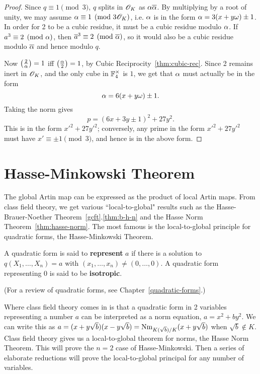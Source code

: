 \begin{proof}
Since $q\equiv 1\pmod 3$, $q$ splits in $\mathscr{O}_K$ as $\alpha\overline{\alpha}$. By multiplying by a root of unity, we may assume $\alpha\equiv 1\pmod{3\mathscr{O}_K}$, i.e. $\alpha$ is in the form $\alpha=3(x+y\omega)\pm1$. In order for 2 to be a cubic residue, it must be a cubic residue modulo $\alpha$. If $a^3\equiv 2\pmod{\alpha}$, then $\overline{a}^3\equiv 2\pmod{\overline{\alpha}}$, so it would also be a cubic residue modulo $\overline{\alpha}$ and hence modulo $q$.

Now $\left( {\frac{2}{\alpha}} \right)=1$ iff $\left( {\frac{\alpha}{2}} \right)=1$, by Cubic Reciprocity~\ref{thm:cubic-rec}. Since 2 remains inert in $\mathscr{O}_K$, and the only cube in $\mathbb{F}_4^{\times}$ is $1$, we get that $\alpha$ must actually be in the form
\[
\alpha=6(x+y\omega)\pm1.
\] 
Taking the norm gives
\[
p=(6x+3y\pm1)^2+27y^2.
\]
This is in the form $x'^2+27y'^2$; conversely, any prime in the form $x'^2+27y'^2$ must have $x'\equiv\pm1 \pmod3$, and hence is in the above form.
\end{proof}

\section{Hasse-Minkowski Theorem}
The global Artin map can be expressed as the product of local Artin maps. From class field theory, we get various ``local-to-global" results such as the Hasse-Brauer-Noether Theorem~\ref{gcft}.\ref{thm:b-h-n} and the Hasse Norm Theorem~\ref{thm:hasse-norm}. The most famous is the local-to-global principle for quadratic forms, the Hasse-Minkowski Theorem.
\begin{df}
A quadratic form is said to \textbf{represent} $a$ if there is a solution to $q(X_1,\ldots, X_n)=a$ with $(x_1,\ldots, x_n)\ne (0,\ldots, 0)$. %
A quadratic form representing 0 is said to be \textbf{isotropic}.
\end{df} 
(For a review of quadratic forms, see Chapter~\ref{quadratic-forms}.) 

Where class field theory comes in is that a quadratic form in 2 variables representing a number $a$ can be interpreted as a norm equation, $a=x^2+by^2$. We can write this as $a=(x+y\sqrt b)(x-y\sqrt b)=\operatorname{Nm}_{K(\sqrt b)/K}(x+y\sqrt b)$ when $\sqrt b\nin K$. Class field theory gives us a local-to-global theorem for norms, the Hasse Norm Theorem. This will prove the $n=2$ case of Hasse-Minkowski. Then a series of elaborate reductions will prove the local-to-global principal for any number of variables.

